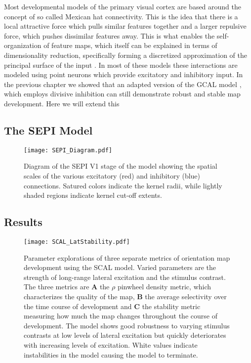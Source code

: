 Most developmental models of the primary visual cortex are based
around the concept of so called Mexican hat connectivity. This is the
idea that there is a local attractive force which pulls similar
features together and a larger repulsive force, which pushes
dissimilar features away. This is what enables the self-organization
of feature maps, which itself can be explained in terms of
dimensionality reduction, specifically forming a discretized
approximation of the principal surface of the input
\citep{Ritter1992}. In most of these models \citep{Miller1994,
  Miikkulainen2005} these interactions are modeled using point neurons
which provide excitatory and inhibitory input. In the previous chapter
we showed that an adapted version of the GCAL model
\citep{Stevens2013}, which employs divisive inhibition can still
demonstrate robust and stable map development. Here we will extend
this

\subsection{The SEPI Model}


\begin{figure}
	\centering
        \texttt{[image: SEPI\_Diagram.pdf]}
	\caption{Diagram of the SEPI V1 stage of the model showing the
          spatial scales of the various excitatory (red) and
          inhibitory (blue) connections. Satured colors indicate the
          kernel radii, while lightly shaded regions indicate kernel
          cut-off extents.}
	\label{SCALDiagram}
\end{figure}


\subsection{Results}

\begin{figure}
	\centering
        \texttt{[image: SCAL\_LatStability.pdf]}
	\caption{Parameter explorations of three separate metrics of
          orientation map development using the SCAL model. Varied
          parameters are the strength of long-range lateral excitation
          and the stimulus contrast. The three metrics are \textbf{A}
          the $\rho$ pinwheel density metric, which characterizes the
          quality of the map, \textbf{B} the average selectivity over
          the time course of development and \textbf{C} the stability
          metric measuring how much the map changes throughout the
          course of development. The model shows good robustness to
          varying stimulus contrasts at low levels of lateral
          excitation but quickly deteriorates with increasing levels
          of excitation. White values indicate instabilities in the
          model causing the model to terminate.}
	\label{SCALStability}
\end{figure}


